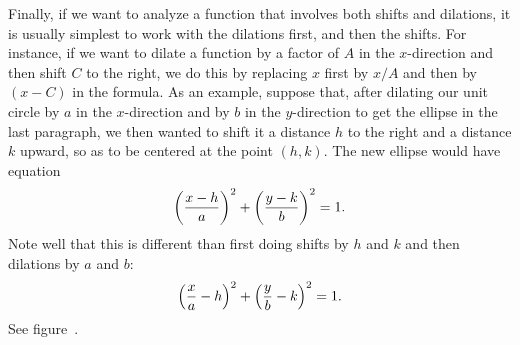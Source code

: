 Finally, if we want to analyze a function that involves both
shifts and dilations, it is usually simplest to work with the
dilations first, and then the shifts.  For instance, if we want to
dilate a function by a factor of $A$ in the $x$-direction and then
shift $C$ to the right, we do this by replacing $x$ first by $x/A$
and then by $(x-C)$ in the formula.  As an example, suppose that,
after dilating our unit circle by $a$ in the $x$-direction and by $b$
in the $y$-direction to get the ellipse in the last paragraph, we then
wanted to shift it a distance $h$ to the right and a distance $k$
upward, so as to be centered at the point $(h,k)$.  The new ellipse
would have equation
$$
\left({x-h\over a}\right)^2+\left({y-k\over b}\right)^2=1.
$$
Note well that this is different than first doing shifts by $h$ and $k$ and
then dilations by $a$ and $b$:
$$
\left({x\over a}-h\right)^2+\left({y\over b}-k\right)^2=1.
$$
See figure~.



